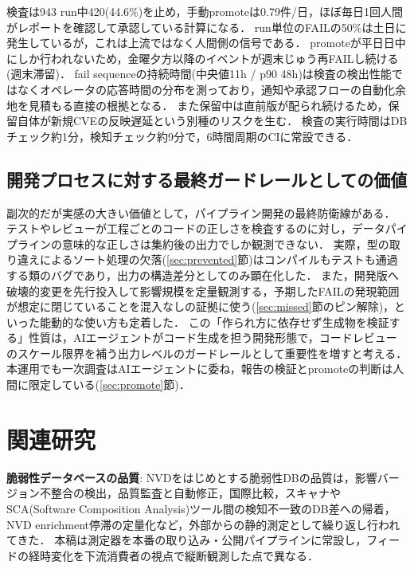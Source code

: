 \documentclass{css}
\begin{document}
検査は943 run中420(44.6\%)を止め，手動promoteは0.79件/日，ほぼ毎日1回人間がレポートを確認して承認している計算になる．
run単位のFAILの50\%は土日に発生しているが，これは上流ではなく人間側の信号である．
promoteが平日日中にしか行われないため，金曜夕方以降のイベントが週末じゅう再FAILし続ける(週末滞留)．
fail sequenceの持続時間(中央値11h / p90 48h)は検査の検出性能ではなくオペレータの応答時間の分布を測っており，通知や承認フローの自動化余地を見積もる直接の根拠となる．
また保留中は直前版が配られ続けるため，保留自体が新規CVEの反映遅延という別種のリスクを生む．
検査の実行時間はDBチェック約1分，検知チェック約9分で，6時間周期のCIに常設できる．

\subsection{開発プロセスに対する最終ガードレールとしての価値}
\label{sec:guardrail}

副次的だが実感の大きい価値として，パイプライン開発の最終防衛線がある．
テストやレビューが工程ごとのコードの正しさを検査するのに対し，データパイプラインの意味的な正しさは集約後の出力でしか観測できない．
実際，型の取り違えによるソート処理の欠落(\ref{sec:prevented}節)はコンパイルもテストも通過する類のバグであり，出力の構造差分としてのみ顕在化した．
また，開発版へ破壊的変更を先行投入して影響規模を定量観測する，予期したFAILの発現範囲が想定に閉じていることを混入なしの証拠に使う(\ref{sec:missed}節のピン解除)，といった能動的な使い方も定着した．
この「作られ方に依存せず生成物を検証する」性質は，AIエージェントがコード生成を担う開発形態で，コードレビューのスケール限界を補う出力レベルのガードレールとして重要性を増すと考える．本運用でも一次調査はAIエージェントに委ね，報告の検証とpromoteの判断は人間に限定している(\ref{sec:promote}節)．

\section{関連研究}
\label{sec:related}

\textbf{脆弱性データベースの品質}:
NVDをはじめとする脆弱性DBの品質は，影響バージョン不整合の検出\cite{dong19}，品質監査と自動修正\cite{anwar22}，国際比較\cite{lin26}，スキャナやSCA(Software Composition Analysis)ツール間の検知不一致のDB差への帰着\cite{imtiaz21,churakova25}，NVD enrichment停滞の定量化\cite{vulncheck24,anchore25}など，外部からの静的測定として繰り返し行われてきた．
本稿は測定器を本番の取り込み・公開パイプラインに常設し，フィードの経時変化を下流消費者の視点で縦断観測した点で異なる．
\end{document}
